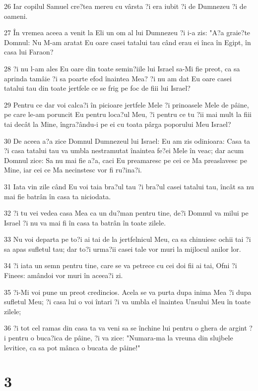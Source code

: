 \par 26 Iar copilul Samuel cre?tea mereu cu vârsta ?i era iubit ?i de Dumnezeu ?i de oameni.
\par 27 În vremea aceea a venit la Eli un om al lui Dumnezeu ?i i-a zis: "A?a graie?te Domnul: Nu M-am aratat Eu oare casei tatalui tau când erau ei înca în Egipt, în casa lui Faraon?
\par 28 ?i nu l-am ales Eu oare din toate semin?iile lui Israel sa-Mi fie preot, ca sa aprinda tamâie ?i sa poarte efod înaintea Mea? ?i nu am dat Eu oare casei tatalui tau din toate jertfele ce se frig pe foc de fiii lui Israel?
\par 29 Pentru ce dar voi calca?i în picioare jertfele Mele ?i prinoasele Mele de pâine, pe care le-am poruncit Eu pentru loca?ul Meu, ?i pentru ce tu ?ii mai mult la fiii tai decât la Mine, îngra?ându-i pe ei cu toata pârga poporului Meu Israel?
\par 30 De aceea a?a zice Domnul Dumnezeul lui Israel: Eu am zis odinioara: Casa ta ?i casa tatalui tau va umbla nestramutat înaintea fe?ei Mele în veac; dar acum Domnul zice: Sa nu mai fie a?a, caci Eu preamaresc pe cei ce Ma preaslavesc pe Mine, iar cei ce Ma necinstesc vor fi ru?ina?i.
\par 31 Iata vin zile când Eu voi taia bra?ul tau ?i bra?ul casei tatalui tau, încât sa nu mai fie batrân în casa ta niciodata.
\par 32 ?i tu vei vedea casa Mea ca un du?man pentru tine, de?i Domnul va milui pe Israel ?i nu va mai fi în casa ta batrân în toate zilele.
\par 33 Nu voi departa pe to?i ai tai de la jertfelnicul Meu, ca sa chinuiesc ochii tai ?i sa apas sufletul tau; dar to?i urma?ii casei tale vor muri la mijlocul anilor lor.
\par 34 ?i iata un semn pentru tine, care se va petrece cu cei doi fii ai tai, Ofni ?i Finees: amândoi vor muri în aceea?i zi.
\par 35 ?i-Mi voi pune un preot credincios. Acela se va purta dupa inima Mea ?i dupa sufletul Meu; ?i casa lui o voi întari ?i va umbla el înaintea Unsului Meu în toate zilele;
\par 36 ?i tot cel ramas din casa ta va veni sa se închine lui pentru o ghera de argint ?i pentru o buca?ica de pâine, ?i va zice: "Numara-ma la vreuna din slujbele levitice, ca sa pot mânca o bucata de pâine!"

\chapter{3}

